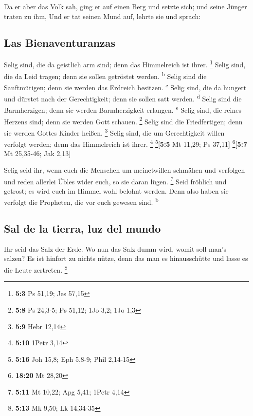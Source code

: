  Da er aber das Volk sah, ging er auf einen Berg und
setzte sich; und seine Jünger traten zu ihm,  Und er tat
seinen Mund auf, lehrte sie und sprach:

\hypertarget{las-bienaventuranzas}{%
\subsection{Las Bienaventuranzas}\label{las-bienaventuranzas}}

 Selig sind, die da geistlich arm sind; denn das
Himmelreich ist ihrer. \footnote{\textbf{5:3} Ps 51,19; Jes 57,15}
 Selig sind, die da Leid tragen; denn sie sollen getröstet
werden. \textsuperscript{b}  Selig sind die Sanftmütigen;
denn sie werden das Erdreich besitzen. \textsuperscript{c}
 Selig sind, die da hungert und dürstet nach der
Gerechtigkeit; denn sie sollen satt werden. \textsuperscript{d}
 Selig sind die Barmherzigen; denn sie werden
Barmherzigkeit erlangen. \textsuperscript{e}  Selig sind,
die reines Herzens sind; denn sie werden Gott schauen. \footnote{\textbf{5:8}
  Ps 24,3-5; Ps 51,12; 1Jo 3,2; 1Jo 1,3}  Selig sind die
Friedfertigen; denn sie werden Gottes Kinder heißen. \footnote{\textbf{5:9}
  Hebr 12,14}  Selig sind, die um Gerechtigkeit willen
verfolgt werden; denn das Himmelreich ist ihrer. \footnote{\textbf{5:10}
  1Petr 3,14} \footnote{\textbf{5:16} Joh 15,8; Eph 5,8-9; Phil 2,14-15}{[}\textbf{5:5}
Mt 11,29; Ps 37,11{]} \footnote{\textbf{18:20} Mt 28,20}{[}\textbf{5:7}
Mt 25,35-46; Jak 2,13{]}

 Selig seid ihr, wenn euch die Menschen um meinetwillen
schmähen und verfolgen und reden allerlei Übles wider euch, so sie daran
lügen. \footnote{\textbf{5:11} Mt 10,22; Apg 5,41; 1Petr 4,14}
 Seid fröhlich und getrost; es wird euch im Himmel wohl
belohnt werden. Denn also haben sie verfolgt die Propheten, die vor euch
gewesen sind. \textsuperscript{b}

\hypertarget{sal-de-la-tierra-luz-del-mundo}{%
\subsection{Sal de la tierra, luz del
mundo}\label{sal-de-la-tierra-luz-del-mundo}}

 Ihr seid das Salz der Erde. Wo nun das Salz dumm wird,
womit soll man's salzen? Es ist hinfort zu nichts nütze, denn das man es
hinausschütte und lasse es die Leute zertreten. \footnote{\textbf{5:13}
  Mk 9,50; Lk 14,34-35}

